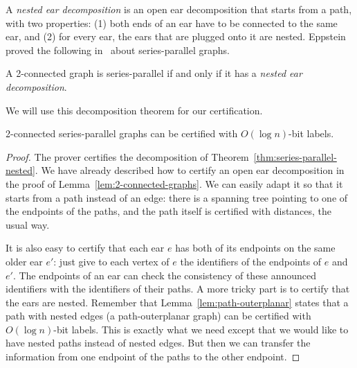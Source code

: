 \documentclass[a4paper,thm-restate,USenglish]{lipics-v2019}
\begin{document}
A \emph{nested ear decomposition} is an open ear decomposition that starts from a path, with two properties: (1) both ends of an ear have to be connected to the same ear, and (2) for every ear, the ears that are plugged onto it are nested. 
Eppstein proved the following in~\cite{Eppstein92} about series-parallel graphs.

\begin{theorem}\label{thm:series-parallel-nested}
A 2-connected graph is series-parallel if and only if it has a \emph{nested ear decomposition}.
\end{theorem}

We will use this decomposition theorem for our certification.

\begin{theorem}\label{thm:2-connected-series-parallel}
2-connected series-parallel graphs can be certified with $O(\log n)$-bit labels.
\end{theorem}

\begin{proof}
The prover certifies the decomposition of Theorem~\ref{thm:series-parallel-nested}.
We have already described how to certify an open ear decomposition in the proof of Lemma~\ref{lem:2-connected-graphs}.
We can easily adapt it so that it starts from a path instead of an edge: there is a spanning tree pointing to one of the endpoints of the paths, and the path itself is certified with distances, the usual way.

It is also easy to certify that each ear $e$ has both of its endpoints on the same older ear $e'$: just give to each vertex of $e$ the identifiers of the endpoints of $e$ and $e'$.
The endpoints of an ear can check the consistency of these announced identifiers with the identifiers of their paths.
A more tricky part is to certify that the ears are nested. 
Remember that Lemma~\ref{lem:path-outerplanar} states that a path with nested edges (a path-outerplanar graph) can be certified with $O(\log n)$-bit labels. 
This is exactly what we need except that we would like to have nested paths instead of nested edges. 
But then we can transfer the information from one endpoint of the paths to the other endpoint. 
\end{proof}
\end{document}

